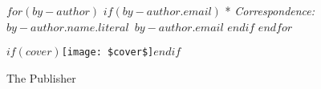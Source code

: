 \begin{minipage}[b][\textheight][s]{0.85\textwidth}
\vspace{1\baselineskip} 

$for(by-author)$
$if(by-author.email)$
* \textit{Correspondence:}~$by-author.name.literal$~$by-author.email$
$endif$
$endfor$


\vfill

$if(cover)$\texttt{[image: \$cover\$]}$endif$

\vspace{0.1\textheight} 

{\noindent The Publisher~~\plogo}\\[\baselineskip] %
\end{minipage}